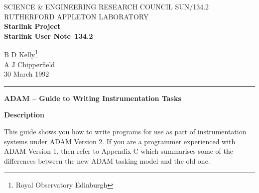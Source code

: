 \pagestyle{myheadings}

\newcommand{\stardoccategory}  {Starlink User Note}
\newcommand{\stardocinitials}  {SUN}
\newcommand{\stardocnumber}    {134.2}
\newcommand{\stardocauthors}   {B D Kelly\footnote{Royal Observatory
Edinburgh}\\A J Chipperfield}
\newcommand{\stardocdate}      {30 March 1992}
\newcommand{\stardoctitle}     {ADAM -- Guide to Writing Instrumentation Tasks}

\newcommand{\stardocname}{\stardocinitials /\stardocnumber}
\renewcommand{\_}{{\tt\char'137}}     %
\markright{\stardocname}
\setlength{\textwidth}{160mm}
\setlength{\textheight}{230mm}
\setlength{\topmargin}{-2mm}
\setlength{\oddsidemargin}{0mm}
\setlength{\evensidemargin}{0mm}
\setlength{\parindent}{0mm}
\setlength{\parskip}{\medskipamount}
\setlength{\unitlength}{1mm}



\thispagestyle{empty}
SCIENCE \& ENGINEERING RESEARCH COUNCIL \hfill \stardocname\\
RUTHERFORD APPLETON LABORATORY\\
{\large\bf Starlink Project\\}
{\large\bf \stardoccategory\ \stardocnumber}
\begin{flushright}
\stardocauthors\\
\stardocdate
\end{flushright}
\vspace{-4mm}
\rule{\textwidth}{0.5mm}
\vspace{5mm}
\begin{center}
{\Huge\bf \stardoctitle}
\end{center}
\vspace{20mm}

\begin{center}
{\Large\bf Description}
\end{center}


This guide shows you how to write programs for use as part of
instrumentation systems under ADAM Version 2. If you are a programmer
experienced with ADAM Version 1, then refer to Appendix C which
summarises some of the differences between the new ADAM tasking model
and the old one. 


